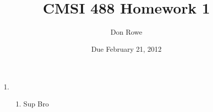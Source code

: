 \documentclass{article}
\title{CMSI 488 Homework 1}
\author{Don Rowe}
\date{Due February 21, 2012}
\begin{document}
  \maketitle
  
  \begin{enumerate}
    \item
    \begin{enumerate}
      \item Sup Bro
    \end{enumerate}
  \end{enumerate}
\end{document}
